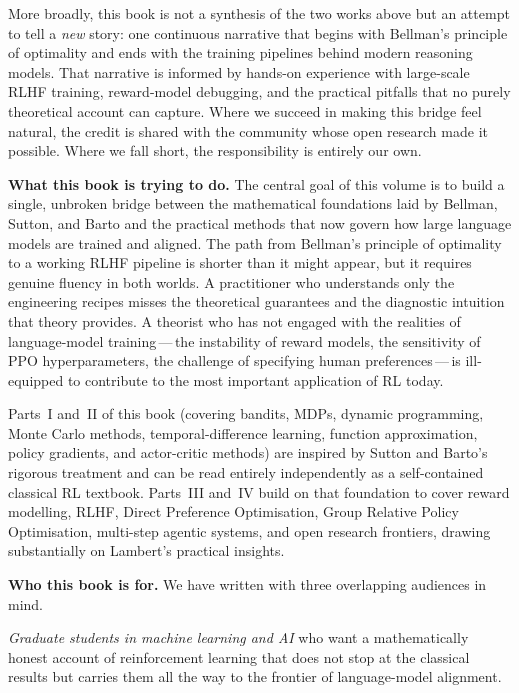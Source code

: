 More broadly, this book is not a synthesis of the two works above but an
attempt to tell a \emph{new} story: one continuous narrative that begins with
Bellman's principle of optimality and ends with the training pipelines behind
modern reasoning models.  That narrative is informed by hands-on experience
with large-scale RLHF training, reward-model debugging, and the practical
pitfalls that no purely theoretical account can capture.  Where we succeed in
making this bridge feel natural, the credit is shared with the community whose
open research made it possible.  Where we fall short, the responsibility is
entirely our own.


\medskip

\textbf{What this book is trying to do.}\quad
The central goal of this volume is to build a single, unbroken bridge between the
mathematical foundations laid by Bellman, Sutton, and Barto and the practical methods that
now govern how large language models are trained and aligned.  The path from Bellman's
principle of optimality to a working RLHF pipeline is shorter than it might appear, but it
requires genuine fluency in both worlds.  A practitioner who understands only the engineering
recipes misses the theoretical guarantees and the diagnostic intuition that theory provides.
A theorist who has not engaged with the realities of language-model training\,---\,the
instability of reward models, the sensitivity of PPO hyperparameters, the challenge of
specifying human preferences\,---\,is ill-equipped to contribute to the most important
application of RL today.

Parts~I and~II of this book (covering bandits, MDPs, dynamic programming, Monte Carlo
methods, temporal-difference learning, function approximation, policy gradients, and
actor-critic methods) are inspired by Sutton and Barto's rigorous treatment and can be read
entirely independently as a self-contained classical RL textbook.  Parts~III and~IV build on
that foundation to cover reward modelling, RLHF, Direct Preference Optimisation, Group
Relative Policy Optimisation, multi-step agentic systems, and open research frontiers,
drawing substantially on Lambert's practical insights.

\medskip

\textbf{Who this book is for.}\quad
We have written with three overlapping audiences in mind.

\emph{Graduate students in machine learning and AI} who want a mathematically honest account
of reinforcement learning that does not stop at the classical results but carries them all the
way to the frontier of language-model alignment.


